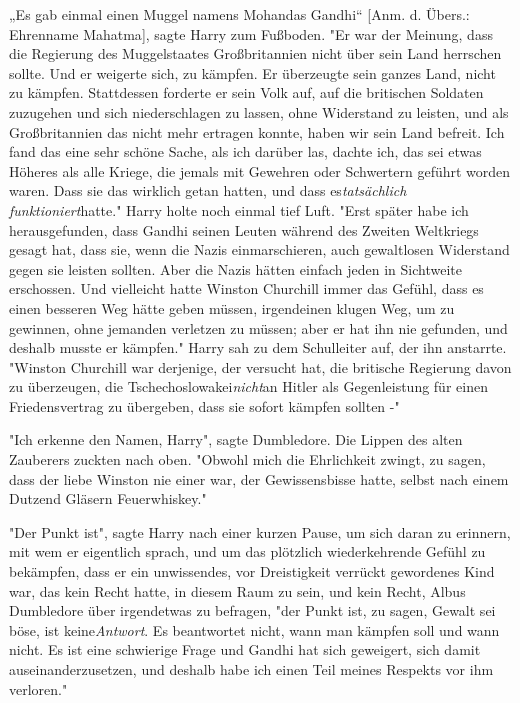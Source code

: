 {„Es gab einmal einen Muggel namens Mohandas Gandhi“ {[}Anm. d. Übers.: Ehrenname Mahatma{]}, sagte Harry zum Fußboden. "Er war der Meinung, dass die Regierung des Muggelstaates Großbritannien nicht über sein Land herrschen sollte. Und er weigerte sich, zu kämpfen. Er überzeugte sein ganzes Land, nicht zu kämpfen. Stattdessen forderte er sein Volk auf, auf die britischen Soldaten zuzugehen und sich niederschlagen zu lassen, ohne Widerstand zu leisten, und als Großbritannien das nicht mehr ertragen konnte, haben wir sein Land befreit. Ich fand das eine sehr schöne Sache, als ich darüber las, dachte ich, das sei etwas Höheres als alle Kriege, die jemals mit Gewehren oder Schwertern geführt worden waren. Dass sie das wirklich getan hatten, und dass es\emph{tatsächlich funktioniert}hatte." Harry holte noch einmal tief Luft. "Erst später habe ich herausgefunden, dass Gandhi seinen Leuten während des Zweiten Weltkriegs gesagt hat, dass sie, wenn die Nazis einmarschieren, auch gewaltlosen Widerstand gegen sie leisten sollten. Aber die Nazis hätten einfach jeden in Sichtweite erschossen. Und vielleicht hatte Winston Churchill immer das Gefühl, dass es einen besseren Weg hätte geben müssen, irgendeinen klugen Weg, um zu gewinnen, ohne jemanden verletzen zu müssen; aber er hat ihn nie gefunden, und deshalb musste er kämpfen." Harry sah zu dem Schulleiter auf, der ihn anstarrte. "Winston Churchill war derjenige, der versucht hat, die britische Regierung davon zu überzeugen, die Tschechoslowakei\emph{nicht}an Hitler als Gegenleistung für einen Friedensvertrag zu übergeben, dass sie sofort kämpfen sollten -"

"Ich erkenne den Namen, Harry", sagte Dumbledore. Die Lippen des alten Zauberers zuckten nach oben. "Obwohl mich die Ehrlichkeit zwingt, zu sagen, dass der liebe Winston nie einer war, der Gewissensbisse hatte, selbst nach einem Dutzend Gläsern Feuerwhiskey."

"Der Punkt ist", sagte Harry nach einer kurzen Pause, um sich daran zu erinnern, mit wem er eigentlich sprach, und um das plötzlich wiederkehrende Gefühl zu bekämpfen, dass er ein unwissendes, vor Dreistigkeit verrückt gewordenes Kind war, das kein Recht hatte, in diesem Raum zu sein, und kein Recht, Albus Dumbledore über irgendetwas zu befragen, "der Punkt ist, zu sagen, Gewalt sei böse, ist keine\emph{Antwort}. Es beantwortet nicht, wann man kämpfen soll und wann nicht. Es ist eine schwierige Frage und Gandhi hat sich geweigert, sich damit auseinanderzusetzen, und deshalb habe ich einen Teil meines Respekts vor ihm verloren."

}
